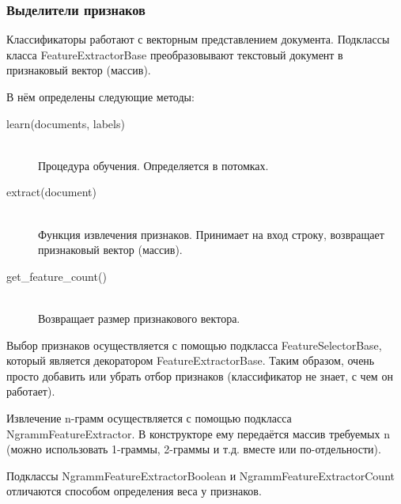\clearpage{}

\subsubsection{Выделители признаков}

Классификаторы работают с векторным представлением документа. 
Подклассы класса FeatureExtractorBase преобразовывают
текстовый документ в признаковый вектор (массив).

В нём определены следующие методы:
\begin{description}

\item[learn(documents, labels)] \hfill \\
Процедура обучения. Определяется в потомках.

\item[extract(document)] \hfill \\
Функция извлечения признаков. Принимает на вход строку,
возвращает признаковый вектор (массив).

\item[get\_feature\_count()] \hfill \\
Возвращает размер признакового вектора.

\end{description}

Выбор признаков осуществляется с помощью подкласса FeatureSelectorBase, который является декоратором FeatureExtractorBase. Таким образом, очень просто
добавить или убрать отбор признаков (классификатор
не знает, с чем он работает).

Извлечение n-грамм осуществляется с помощью
подкласса NgrammFeatureExtractor. В конструкторе ему передаётся массив требуемых n (можно использовать 1-граммы, 2-граммы и т.д. вместе или по-отдельности).

Подклассы NgrammFeatureExtractorBoolean и NgrammFeatureExtractorCount отличаются способом
определения веса у признаков.

